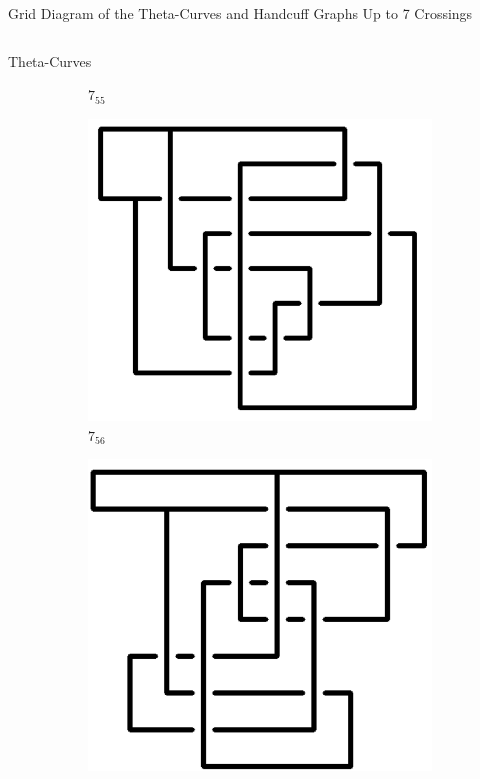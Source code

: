 \documentclass[final]{beamer}
\begin{document}
\begin{frame}[t]
\begin{alertblock}{Grid Diagram of the Theta-Curves and Handcuff Graphs Up to 7 Crossings}
\begin{columns}[t]
\begin{column}{0.5\textwidth}
\begin{alertblock}{Theta-Curves}
\begin{figure}
\begin{subfigure}{0.075\textwidth}
    \caption{$7_{55}$} 
    \end{subfigure}
    \begin{subfigure}{0.075\textwidth}
    \includegraphics[width=\columnwidth]{../Midterm_Poster/grid_diagram/theta_7_56.png}
    \caption{$7_{56}$} 
    \end{subfigure}
    \begin{subfigure}{0.075\textwidth}
    \includegraphics[width=\columnwidth]{../Midterm_Poster/grid_diagram/theta_7_57.png}

\end{subfigure}
\end{figure}
\end{alertblock}
\end{column}
\end{columns}
\end{alertblock}
\end{frame}
\end{document}
